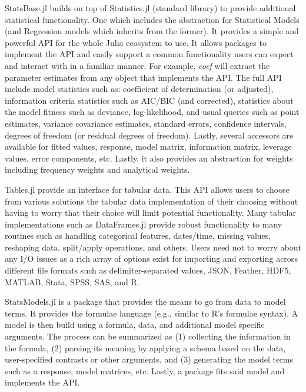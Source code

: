 \documentclass{juliacon}
\begin{document}
StatsBase.jl \cite{StatsBase.jl} builds on top of Statistics.jl (standard library) to provide additional statistical functionality. One which includes the abstraction for Statistical Models (and Regression models which inherits from the former). It provides a simple and powerful API for the whole Julia ecosystem to use. It allows packages to implement the API and easily support a common functionality users can expect and interact with in a familiar manner. For example, \textit{coef} will extract the parameter estimates from any object that implements the API. The full API include model statistics such as: coefficient of determination (or adjusted), information criteria statistics such as AIC/BIC (and corrected), statistics about the model fitness such as deviance, log-likelihood, and usual queries such as point estimates, variance covariance estimates, standard errors, confidence intervals, degrees of freedom (or residual degrees of freedom). Lastly, several accessors are available for fitted values, response, model matrix, information matrix, leverage values, error components, etc. Lastly, it also provides an abstraction for weights including frequency weights and analytical weights.

Tables.jl \cite{Tables.jl} provide an interface for tabular data. This API allows users to choose from various solutions the tabular data implementation of their choosing without having to worry that their choice will limit potential functionality. Many tabular implementations such as DataFrames.jl \cite{DataFrames.jl} provide robust functionality to many routines such as handling categorical features, dates/time, missing values, reshaping data, split/apply operations, and others. Users need not to worry about any I/O issues as a rich array of options exist for importing and exporting across different file formats such as delimiter-separated values, JSON, Feather, HDF5, MATLAB, Stata, SPSS, SAS, and R.

StatsModels.jl \cite{StatsModels.jl} is a package that provides the means to go from data to model terms. It provides the formulae language (e.g., similar to R's formulae syntax). A model is then build using a formula, data, and additional model specific arguments. The process can be summarized as (1) collecting the information in the formula, (2) parsing its meaning by applying a schema based on the data, user-specified contrasts or other arguments, and (3) generating the model terms such as a response, model matrices, etc. Lastly, a package fits said model and implements the API.
\end{document}

